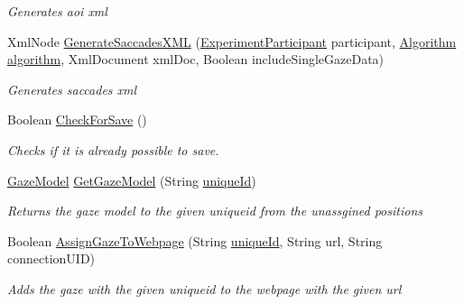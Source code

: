 \begin{DoxyCompactItemize}
\begin{DoxyCompactList}\small\item\em Generates aoi xml \end{DoxyCompactList}\item 
Xml\+Node \hyperlink{class_web_analyzer_1_1_models_1_1_data_model_1_1_test_model_ab0396a32b51bbf18ead2223eae6d729c}{Generate\+Saccades\+X\+M\+L} (\hyperlink{class_web_analyzer_1_1_models_1_1_base_1_1_experiment_participant}{Experiment\+Participant} participant, \hyperlink{class_web_analyzer_1_1_models_1_1_algorithm_model_1_1_algorithm}{Algorithm} \hyperlink{_u_i_2_h_t_m_l_resources_2js_2src_2analyse_8js_a1222cf9678e9ad6a699b071d3308f976}{algorithm}, Xml\+Document xml\+Doc, Boolean include\+Single\+Gaze\+Data)
\begin{DoxyCompactList}\small\item\em Generates saccades xml \end{DoxyCompactList}\item 
Boolean \hyperlink{class_web_analyzer_1_1_models_1_1_data_model_1_1_test_model_abc6d6772659bfd91a6d1fe6923ca7a2b}{Check\+For\+Save} ()
\begin{DoxyCompactList}\small\item\em Checks if it is already possible to save. \end{DoxyCompactList}\item 
\hyperlink{class_web_analyzer_1_1_models_1_1_data_model_1_1_gaze_model}{Gaze\+Model} \hyperlink{class_web_analyzer_1_1_models_1_1_data_model_1_1_test_model_a276585c6c2bdca3cf99058e2287636dc}{Get\+Gaze\+Model} (String \hyperlink{_u_i_2_h_t_m_l_resources_2js_2lib_2underscore_8min_8js_af690ff5521d79c7128861033ae80ae17}{unique\+Id})
\begin{DoxyCompactList}\small\item\em Returns the gaze model to the given uniqueid from the unassgined positions \end{DoxyCompactList}\item 
Boolean \hyperlink{class_web_analyzer_1_1_models_1_1_data_model_1_1_test_model_acb4622f0eb7451a866e94a8b29f13510}{Assign\+Gaze\+To\+Webpage} (String \hyperlink{_u_i_2_h_t_m_l_resources_2js_2lib_2underscore_8min_8js_af690ff5521d79c7128861033ae80ae17}{unique\+Id}, String url, String connection\+U\+I\+D)
\begin{DoxyCompactList}\small\item\em Adds the gaze with the given uniqueid to the webpage with the given url \end{DoxyCompactList}\item 

\end{DoxyCompactItemize}
